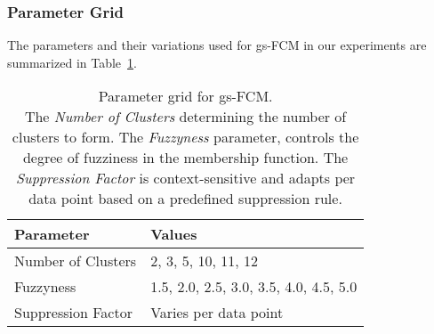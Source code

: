 \subsubsection{Parameter Grid}




The parameters and their variations used for gs-FCM in our experiments are summarized in Table~\ref{tab:gsfcm-param-grid}.

\begin{table}[h!]
\centering
\begin{tabularx}{\columnwidth}{|X|X|}
    \hline
    \textbf{Parameter} & \textbf{Values} \\ \hline
    Number of Clusters & 2, 3, 5, 10, 11, 12 \\ \hline
    Fuzzyness & 1.5, 2.0, 2.5, 3.0, 3.5, 4.0, 4.5, 5.0 \\ \hline
    Suppression Factor & Varies per data point \\ \hline
\end{tabularx}
\caption{
    Parameter grid for gs-FCM.\\ 
    The \textit{Number of Clusters} determining the number of clusters to form.
    The \textit{Fuzzyness} parameter, controls the degree of fuzziness in the membership function.
    The \textit{Suppression Factor} is context-sensitive and adapts per data point based on a predefined suppression rule.
}
\label{tab:gsfcm-param-grid}
\end{table}
